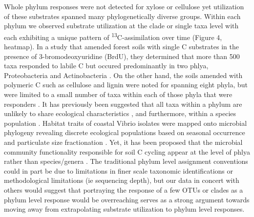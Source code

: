 Whole phylum responses were not detected for xylose or cellulose yet utilization of these substrates spanned many phylogenetically diverse groups. Within each phylum we observed substrate utilization at the clade or single taxa level with each exhibiting a unique pattern of \textsuperscript{13}C-assimilation over time (Figure 4, heatmap). In a study that amended forest soils with single C substrates in the presence of 3-bromodeoxyuridine (BrdU), they determined that more than 500 taxa responded to labile C but occured predominantly in two phlya, Proteobacteria and Actinobacteria \cite{Goldfarb_2011}. On the other hand, the soils amended with polymeric C such as cellulose and lignin were noted for spanning eight phyla, but were limited to a small number of taxa within each of those phyla that were responders \cite{Goldfarb_2011}. It has previously been suggested that all taxa within a phylum are unlikely to share ecological characteristics \cite{Fierer_2007}, and furthermore, within a species population \cite{Choudoir_2012,Preheim_2011,Hunt_2008}. Habitat traits of coastal Vibrio isolates were mapped onto microbial phylogeny revealing discrete ecological populations based on seasonal occurrence and particulate size fractionation \cite{Preheim_2011,Hunt_2008}. Yet, it has been proposed that the microbial community functionality responsible for soil C cycling appear at the level of phlya rather than species/genera \cite{Schimel_2012}. The traditional phylum level assignment conventions could in part be due to limitations in finer scale taxonomic identifications or methodological limitations (ie sequencing depth), but our data in concert with others \cite{Goldfarb_2011,Fierer_2007,Choudoir_2012,Preheim_2011,Hunt_2008} would suggest that portraying the response of a few OTUs or clades as a phylum level response would be overreaching serves as a strong argument towards moving away from extrapolating substrate utilization to phylum level responses.

